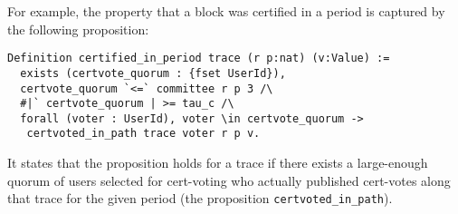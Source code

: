 For example, the property that a block was certified in a period is captured by the following proposition:
\begin{lstlisting}[language=Coq]
Definition certified_in_period trace (r p:nat) (v:Value) :=
  exists (certvote_quorum : {fset UserId}),
  certvote_quorum `<=` committee r p 3 /\
  #|` certvote_quorum | >= tau_c /\
  forall (voter : UserId), voter \in certvote_quorum ->
   certvoted_in_path trace voter r p v.
\end{lstlisting}
It states that the proposition holds for a trace if there exists a large-enough quorum of users selected for cert-voting who actually published cert-votes along that trace for the given period (the proposition \lstinline{certvoted_in_path}).

